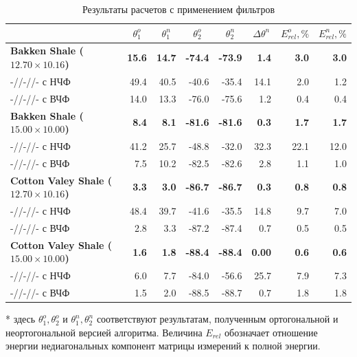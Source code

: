 \documentclass[a4paper,11pt]{article}
\begin{document}
\begin{table}[h]
	\footnotesize
	\centering
	\caption{Результаты расчетов с применением фильтров}
	\renewcommand{\arraystretch}{1.5}
	\begin{tabularx}{\textwidth}{|X|rr|rr|r|rr|}
		\hline
		&\multicolumn{1}{c}{$\theta_1^o$} & \multicolumn{1}{c|}{$\theta_1^n$} & \multicolumn{1}{c}{$\theta_2^o$} & \multicolumn{1}{c|}{$\theta_2^n$} & \multicolumn{1}{c|}{$\Delta\theta^n$}& \multicolumn{1}{c}{$E_{rel}^o, \%$} & \multicolumn{1}{c|}{$E_{rel}^n, \%$} \\ \hline
		\hline	\textbf{Bakken Shale ($12.70 \times 10.16$)} & \textbf{15.6} & \textbf{14.7} & \textbf{-74.4}  & \textbf{-73.9}  & \textbf{1.4}  & \textbf{3.0} & \textbf{3.0} \\
		-//-//- с НЧФ & 49.4 & 40.5 & -40.6 & -35.4  & 14.1 & 2.0 & 1.2\\
		-//-//- с ВЧФ & 14.0 & 13.3 & -76.0 & -75.6  & 1.2 & 0.4 & 0.4\\
		\hline	\textbf{Bakken Shale ($15.00 \times 10.00$)} & \textbf{8.4} & \textbf{8.1} & \textbf{-81.6}  & \textbf{-81.6} & \textbf{0.3}  & \textbf{1.7} & \textbf{1.7} \\
		-//-//- с НЧФ & 41.2 & 25.7 & -48.8 & -32.0  & 32.3 & 22.1 & 12.0\\
		-//-//- с ВЧФ & 7.5 & 10.2 & -82.5 & -82.6  & 2.8 & 1.1 & 1.0\\
		\hline	\textbf{Cotton Valey Shale ($12.70 \times 10.16$)} & \textbf{3.3} & \textbf{3.0} & \textbf{-86.7}  & \textbf{-86.7}  & \textbf{0.3}  & \textbf{0.8} & \textbf{0.8}\\
		-//-//- с НЧФ & 48.4 & 39.7 & -41.6 & -35.5  & 14.8  & 9.7 & 7.0 \\
		-//-//- с ВЧФ & 2.8 & 3.3 & -87.2 & -87.4  & 0.7  & 0.5 & 0.5\\	
		\hline	\textbf{Cotton Valey Shale ($15.00 \times 10.00$)} & \textbf{1.6} & \textbf{1.8} & \textbf{-88.4}  & \textbf{-88.4}  & \textbf{0.00}  & \textbf{0.6} & \textbf{0.6} \\
		-//-//- с НЧФ & 6.0 & 7.7 & -84.0 & -56.6  & 25.7  & 7.9 & 7.3 \\
		-//-//- с ВЧФ & 1.5 & 2.0 & -88.5 & -88.7  & 0.7  & 1.8 & 1.8\\		
		\hline	
	\end{tabularx} 
	\begin{flushleft}
		* здесь $\theta_1^o,\theta_2^o$ и $\theta_1^n,\theta_2^n$ соответствуют результатам, полученным ортогональной и неортогональной версией алгоритма. Величина $E_{rel}$ обозначает отношение энергии недиагональных компонент матрицы измерений к полной энергии.
	\end{flushleft}
	\label{tab:filter_process_results}
	\renewcommand{\arraystretch}{1.0}
\end{table}

\clearpage

%
%

%


%
\end{document}
